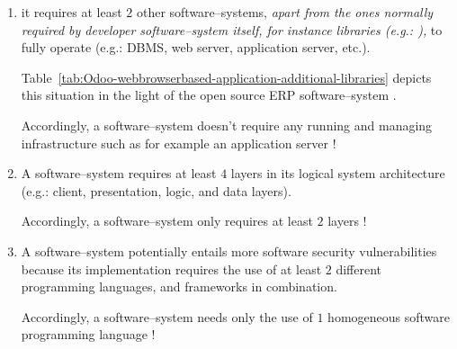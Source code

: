 \begin{enumerate}[1.]
	\item it requires at least $2$ other 
		software--systems, \emph{apart from
		the ones normally required by developer
		software--system itself, for instance libraries (e.g.:
		\logFourJ),} to fully operate
		(e.g.: DBMS, web server, application server, etc.).
		
		Table~\ref{tab:Odoo-webbrowserbased-application-additional-libraries}
		depicts this situation in the light of the
		open source ERP software--system \Odoo.	
		
		\textcolor{purplish}{Accordingly, a \thickclient
		software--system doesn't require any running and 
		managing infrastructure such as for example an
		application server !}	
				
	\item A \webbrowserbased software--system
		requires at least $4$ layers in
		its logical system architecture
		(e.g.: client, presentation, logic,
		and data layers).
		
		\textcolor{purplish}{Accordingly, a \thickclient
		software--system only requires at least $2$ layers !}

	\item A \webbrowserbased software--system
		potentially entails more software security
		vulnerabilities because its implementation requires
		the use of at least $2$ different programming
		languages, and frameworks in combination.
		
		\textcolor{purplish}{Accordingly, a \thickclient
		software--system needs only the use of $1$ homogeneous
		software programming language !}
\end{enumerate}

